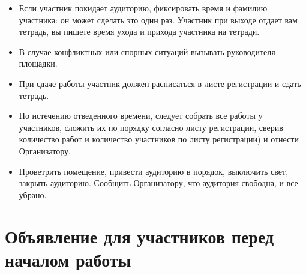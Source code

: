 \documentclass[a4paper,12pt]{article}
\begin{document}
\begin{itemize}
	\item Если участник покидает аудиторию, фиксировать время и фамилию участника: он может сделать это один раз. Участник при выходе отдает вам тетрадь, вы пишете время ухода и прихода участника на тетради.
	\item В случае конфликтных или спорных ситуаций вызывать руководителя площадки.
	\item При сдаче работы участник должен расписаться в листе регистрации и сдать тетрадь.
	\item По истечению отведенного времени, следует собрать все работы у участников, сложить их по порядку согласно листу регистрации, сверив количество работ и количество участников по листу регистрации) и отнести Организатору.
	\item Проветрить помещение, привести аудиторию в порядок, выключить свет, закрыть аудиторию. Сообщить Организатору, что аудитория свободна, и все убрано. 
\end{itemize}

\section{Объявление для участников перед началом работы}
\end{document}
